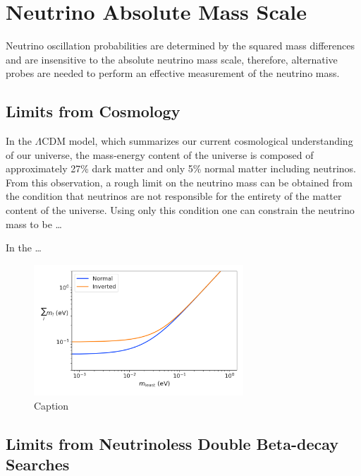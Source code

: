 \section{Neutrino Absolute Mass Scale}

Neutrino oscillation probabilities are determined by the squared mass differences and are insensitive to the absolute neutrino mass scale, therefore, alternative probes are needed to perform an effective measurement of the neutrino mass.

\subsection{Limits from Cosmology}

In the $\Lambda$CDM model, which summarizes our current cosmological understanding of our universe, the mass-energy content of the universe is composed of approximately 27\% dark matter and only 5\% normal matter including neutrinos. From this observation, a rough limit on the neutrino mass can be obtained from the condition that neutrinos are not responsible for the entirety of the matter content of the universe. Using only this condition one can constrain the neutrino mass to be \ldots

In the \ldots

\begin{figure}[htbp]
    \centering
    \includegraphics[width=0.7\textwidth]{figs/Chapter-2/230301_cosmology_nu_mass_observable.png}
    \caption{Caption}
    \label{fig:nu_mass_cosmo}
\end{figure}


\subsection{Limits from Neutrinoless Double Beta-decay Searches}

